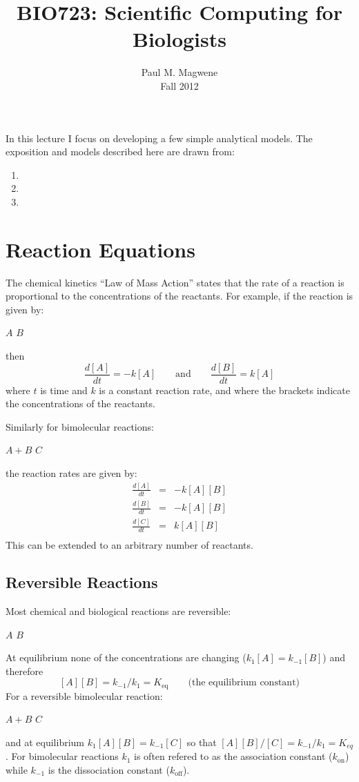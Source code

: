 \documentclass[11pt,letterpaper,oneside,pagesize]{scrartcl}
\title{BIO723: Scientific Computing for Biologists}
\author{Paul M. Magwene\\Fall 2012}
\begin{document}
\maketitle

In this lecture I focus on developing a few simple analytical models. The exposition and models described here are drawn from:


\begin{enumerate}
    \item {}
    \item {}
    \item {}
\end{enumerate}

\section{Reaction Equations}

The chemical kinetics ``Law of Mass Action'' states that the rate of a reaction is proportional to the concentrations of the reactants. For example, if the reaction is given by:
%
\begin{center}
    $A$ \ce{->[k]} $B$
\end{center}
%
then
%
\[
\frac{d[A]}{dt} = -k[A] \qquad  \mbox{and} \qquad \frac{d[B]}{dt} =  k[A]
\]
%
where $t$ is time and $k$ is a constant reaction rate, and where the brackets indicate the concentrations of the reactants.

Similarly for bimolecular reactions:
\begin{center}
$A + B$ \ce{->[k]} $C$
\end{center}
the reaction rates are given by:
\begin{eqnarray*}
\frac{d[A]}{dt} & = & -k[A][B] \\
\frac{d[B]}{dt} & = & -k[A][B] \\
\frac{d[C]}{dt} & = & k[A][B] \\
\end{eqnarray*}
This can be extended to an arbitrary number of reactants.

\subsection{Reversible Reactions}

Most chemical and biological reactions are reversible:
\begin{center}
    $A$ \ce{<=>[k_1][k_{-1}]} $B$
\end{center}
%
At equilibrium none of the concentrations are changing ($k_1[A] = k_{-1}[B]$)
and therefore
\[
[A][B] = k_{-1}/k_1 = K_{\mathrm{eq}}\qquad \mbox{(the equilibrium constant)}
\]
%
For a reversible bimolecular reaction:
\begin{center}
    $A + B$ \ce{<=>[k_1][k_{-1}]} $C$
\end{center}
and at equilibrium $k_1[A][B] = k_{-1}[C]$ so that $[A][B]/[C] = k_{-1}/k_1 = K_{eq}$. For bimolecular reactions $k_1$ is often refered to as the association constant ($k_{\mathrm{on}}$) while $k_{-1}$ is the dissociation constant ($k_{\mathrm{off}}$).
\end{document}
